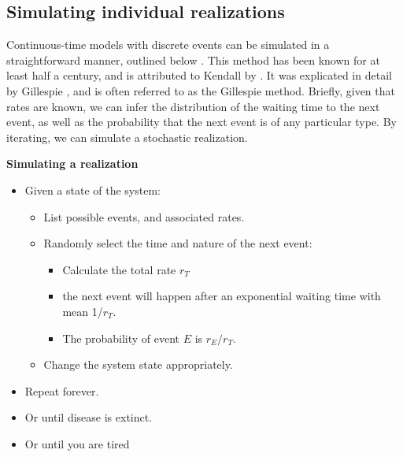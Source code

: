 \documentclass{amsproc}
\theoremstyle{definition}
\theoremstyle{remark}
\numberwithin{equation}{section}
\begin{document}
\subsection{Simulating individual realizations}

Continuous-time models with discrete events can be simulated in a straightforward manner, outlined below .  This method has been known for at least half a century, and is attributed to Kendall by .  It was explicated in detail by Gillespie , and is often referred to as the Gillespie method.
Briefly, given that rates are known, we can infer the distribution of the waiting time to the next event, as well as the probability that the next event is of any particular type.  By iterating, we can simulate a stochastic realization.

\begin{table}

{\bf Simulating a realization}

\begin{itemize}

	\item Given a state of the system: 

	\begin{itemize}

		\item List possible events, and associated rates. 

		\item Randomly select the time and nature of the next event:

		\begin{itemize}

			\item Calculate the total rate $r_T$

			\item the next event will happen after an exponential waiting
			time with mean 1/$r_T.$ 

			\item The probability of event $E$ is $r_E/r_T$. 

		\end{itemize}

		\item Change the system state appropriately. 

	\end{itemize}

	\item Repeat forever. 

	\item Or until disease is extinct. 

	\item Or until you are tired 

\end{itemize}
\caption[Gillespie]{
%
	Steps in simulating a demographic model.
%
}
\end{table}
\end{document}
